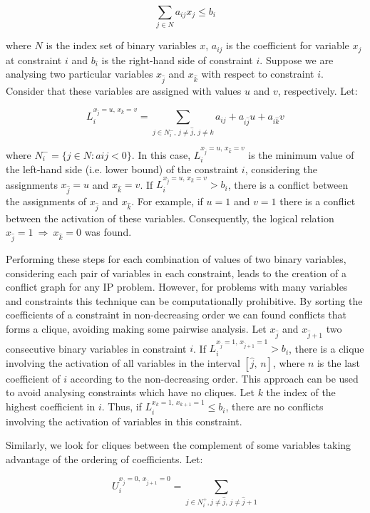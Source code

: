 \documentclass{endm}
\begin{document}
\[\sum_{j \in N} a_{ij}x_{j} \leq b_{i}\]

\noindent where $N$ is the index set of binary variables $x$, $a_{ij}$ is the coefficient for variable $x_{j}$ at constraint $i$ and $b_{i}$ is the right-hand side of constraint $i$. Suppose we are analysing two particular variables $x_{\hat{j}}$ and $x_{\hat{k}}$ with respect to constraint $i$. Consider that these variables are assigned with values $u$ and $v$, respectively. Let:

\[ L_{i}^{x_{\hat{j}} = u,\, x_{\hat{k}} = v}=\sum_{j\in N_{i}^{-},\, j\neq\hat{j},\, j\neq\hat{k}}a_{ij}+a_{i\hat{j}}u+a_{i\hat{k}}v \]

\noindent where $N_{i}^{-} = \{j \in N : aij < 0\}$. In this case, $L_{i}^{x_{\hat{j}} = u,\, x_{\hat{k}} = v}$ is the minimum value of the left-hand side (i.e. lower bound) of the constraint $i$, considering the assignments $x_{\hat{j}} = u$ and $x_{\hat{k}} = v$. If $L_{i}^{x_{\hat{j}} = u,\, x_{\hat{k}} = v} > b_{i}$, there is a conflict between the assignments of $x_{\hat{j}}$ and $x_{\hat{k}}$. For example, if $u = 1$ and $v = 1$ there is a conflict between the activation of these variables. Consequently, the logical relation $x_{\hat{j}} = 1 \ \Rightarrow \ x_{\hat{k}} = 0$ was found.

Performing these steps for each combination of values ​​of two binary variables, considering each pair of variables in each constraint, leads to the creation of a conflict graph for any IP problem. However, for problems with many variables and constraints this technique can be computationally prohibitive. By sorting the coefficients of a constraint in non-decreasing order we can found conflicts that forms a clique, avoiding making some pairwise analysis. Let $x_{\hat{j}}$ and $x_{\hat{j}+1}$ two consecutive binary variables in constraint $i$. If $L_{i}^{x_{\hat{j}}=1,\, x_{\hat{j}+1}=1}>b_{i}$, there is a clique involving the activation of all variables in the interval $[\hat{j},\, n]$, where $n$ is the last coefficient of $i$ according to the non-decreasing order. This approach can be used to avoid analysing constraints which have no cliques. Let $k$ the index of the highest coefficient in $i$. Thus, if $L_{i}^{x_{k}=1,\, x_{k+1}=1}\leq b_{i}$, there are no conflicts involving the activation of variables in this constraint.

Similarly, we look for cliques between the complement of some variables taking advantage of the ordering of coefficients. Let:

\[ U_{i}^{x_{\hat{j}} = 0,\, x_{\hat{j}+1} = 0} = \sum_{j \in N_i^+, j\neq\hat{j},\, j\neq\hat{j}+1} \]
\end{document}
